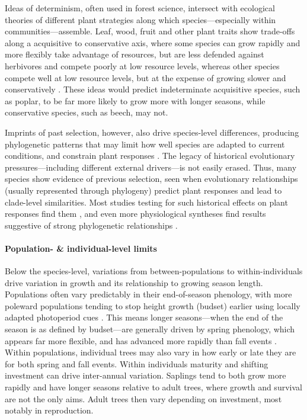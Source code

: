 \documentclass[11pt]{article}
\begin{document}
Ideas of determinism, often used in forest science, intersect with ecological theories of different plant strategies along which species---especially within communities---assemble. Leaf, wood, fruit and other plant traits show trade-offs along a acquisitive to conservative axis, where some species can grow rapidly and more flexibly take advantage of resources, but are less defended against herbivores and compete poorly at low resource levels, whereas other species compete well at low resource levels, but at the expense of growing slower and conservatively \citep[][]{Grime:1977sw,diaz2016}. These ideas would predict indeterminate acquisitive species, such as poplar, to be far more likely to grow more with longer seasons, while conservative species, such as beech, may not. %

Imprints of past selection, however, also drive species-level differences, producing phylogenetic patterns that may limit how well species are adapted to current conditions, and constrain plant responses \citep{Ackerly:2009ly,phenophylo}. The legacy of historical evolutionary pressures---including different external drivers---is not easily erased.  Thus, many species show evidence of previous selection, seen when evolutionary relationships (usually represented through phylogeny) predict plant responses and lead to clade-level similarities. Most studies testing for such historical effects on plant responses find them \citep[e.g.,][]{phenophylo}, and even more physiological syntheses find results suggestive of strong phylogenetic relationships \citep[though they are more rarely formally tested, e.g.,][]{way2010differential}. 

\paragraph{Population- \& individual-level limits}
Below the species-level, variations from between-populations to within-individuals drive variation in growth and its relationship to growing season length. Populations often vary predictably in their end-of-season phenology, with more poleward populations tending to stop height growth (budset) earlier using locally adapted photoperiod cues \citep{soolanayakanahally2013timing,aitken2016}. This means longer seasons---when the end of the season is as defined by budset---are generally driven by spring phenology, which appears far more flexible, and has advanced more rapidly than fall events \citep{aitken2016}. Within populations, individual trees may also vary in how early or late they are for both spring and fall events. Within individuals maturity and shifting investment can drive inter-annual variation. Saplings tend to both grow more rapidly and have longer seasons relative to adult trees, where growth and survival are not the only aims. Adult trees then vary depending on investment, most notably in reproduction. 
\end{document}
